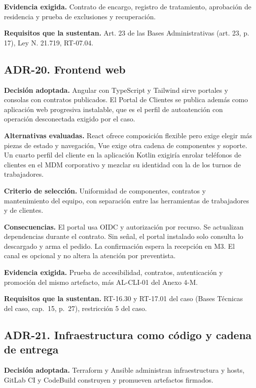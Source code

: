 \textbf{Evidencia exigida.} Contrato de encargo, registro de tratamiento, aprobación de residencia y prueba de exclusiones y recuperación.

\textbf{Requisitos que la sustentan.} Art. 23 de las Bases Administrativas (art. 23, p. 17), Ley N.\textdegree{} 21.719, RT-07.04.

\subsection*{ADR-20. Frontend web}
\label{sub:adr-20}
\textbf{Decisión adoptada.} Angular con TypeScript y Tailwind sirve portales y consolas con contratos publicados. El Portal de Clientes se publica además como aplicación web progresiva instalable, que es el perfil de autoatención con operación desconectada exigido por el caso.

\textbf{Alternativas evaluadas.} React ofrece composición flexible pero exige elegir más piezas de estado y navegación, Vue exige otra cadena de componentes y soporte. Un cuarto perfil del cliente en la aplicación Kotlin exigiría enrolar teléfonos de clientes en el MDM corporativo y mezclar su identidad con la de los turnos de trabajadores.

\textbf{Criterio de selección.} Uniformidad de componentes, contratos y mantenimiento del equipo, con separación entre las herramientas de trabajadores y de clientes.

\textbf{Consecuencias.} El portal usa OIDC y autorización por recurso. Se actualizan dependencias durante el contrato. Sin señal, el portal instalado solo consulta lo descargado y arma el pedido. La confirmación espera la recepción en M3. El canal es opcional y no altera la atención por preventista.

\textbf{Evidencia exigida.} Prueba de accesibilidad, contratos, autenticación y promoción del mismo artefacto, más AL-CLI-01 del Anexo 4-M.

\textbf{Requisitos que la sustentan.} RT-16.30 y RT-17.01 del caso (Bases Técnicas del caso, cap.~15, p.~27), restricción 5 del caso.

\subsection*{ADR-21. Infraestructura como código y cadena de entrega}
\label{sub:adr-21}
\textbf{Decisión adoptada.} Terraform y Ansible administran infraestructura y hosts, GitLab CI y CodeBuild construyen y promueven artefactos firmados.

